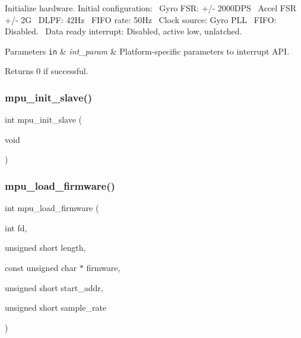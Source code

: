 Initialize hardware. Initial configuration\+:~\newline
Gyro F\+SR\+: +/-\/ 2000\+D\+PS~\newline
Accel F\+SR +/-\/ 2G~\newline
D\+L\+PF\+: 42\+Hz~\newline
F\+I\+FO rate\+: 50\+Hz~\newline
Clock source\+: Gyro P\+LL~\newline
F\+I\+FO\+: Disabled.~\newline
Data ready interrupt\+: Disabled, active low, unlatched. 


\begin{DoxyParams}[1]{Parameters}
\mbox{\tt in}  & {\em int\+\_\+param} & Platform-\/specific parameters to interrupt A\+PI. \\
\hline
\end{DoxyParams}
\begin{DoxyReturn}{Returns}
0 if successful. 
\end{DoxyReturn}
\mbox{\label{group___d_r_i_v_e_r_s_ga9093183fe619360b3b1bfb8aab030592}} 
\subsubsection{mpu\+\_\+init\+\_\+slave()}
{\footnotesize\ttfamily int mpu\+\_\+init\+\_\+slave (\begin{DoxyParamCaption}\item[{void}]{ }\end{DoxyParamCaption})}

\mbox{\label{group___d_r_i_v_e_r_s_gafab20023c66396a45d16835fb7f5ba16}} 
\subsubsection{mpu\+\_\+load\+\_\+firmware()}
{\footnotesize\ttfamily int mpu\+\_\+load\+\_\+firmware (\begin{DoxyParamCaption}\item[{int}]{fd,  }\item[{unsigned short}]{length,  }\item[{const unsigned char $\ast$}]{firmware,  }\item[{unsigned short}]{start\+\_\+addr,  }\item[{unsigned short}]{sample\+\_\+rate }\end{DoxyParamCaption})}




